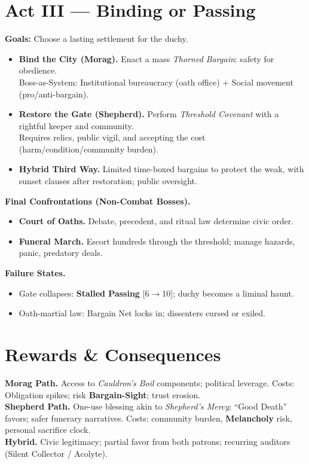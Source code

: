 \documentclass[11pt]{article}
\newcommand{\clock}[1]{\textsc{[#1]}}
\begin{document}
\section*{Act III --- Binding or Passing}
\textbf{Goals:} Choose a lasting settlement for the duchy.
\begin{itemize}
  \item \textbf{Bind the City (Morag).} Enact a mass \textit{Thorned Bargain}: safety for obedience.\\
  Boss-as-System: Institutional bureaucracy (oath office) + Social movement (pro/anti-bargain).
  \item \textbf{Restore the Gate (Shepherd).} Perform \textit{Threshold Covenant} with a rightful keeper and community.\\
  Requires relics, public vigil, and accepting the cost (harm/condition/community burden).
  \item \textbf{Hybrid Third Way.} Limited time-boxed bargains to protect the weak, with sunset clauses after restoration; public oversight.
\end{itemize}
\textbf{Final Confrontations (Non-Combat Bosses).}
\begin{itemize}
  \item \textbf{Court of Oaths.} Debate, precedent, and ritual law determine civic order.
  \item \textbf{Funeral March.} Escort hundreds through the threshold; manage hazards, panic, predatory deals.
\end{itemize}
\textbf{Failure States.}
\begin{itemize}
  \item Gate collapses: \textbf{Stalled Passing} \clock{6$\to$10}; duchy becomes a liminal haunt.
  \item Oath-martial law: Bargain Net locks in; dissenters cursed or exiled.
\end{itemize}

\section*{Rewards \& Consequences}
\textbf{Morag Path.} Access to \textit{Cauldron's Boil} components; political leverage. Costs: Obligation spikes; risk \textbf{Bargain-Sight}; trust erosion.\\
\textbf{Shepherd Path.} One-use blessing akin to \textit{Shepherd's Mercy}; ``Good Death'' favors; safer funerary narratives. Costs: community burden, \textbf{Melancholy} risk, personal sacrifice clock.\\
\textbf{Hybrid.} Civic legitimacy; partial favor from both patrons; recurring auditors (Silent Collector / Acolyte).
\end{document}

